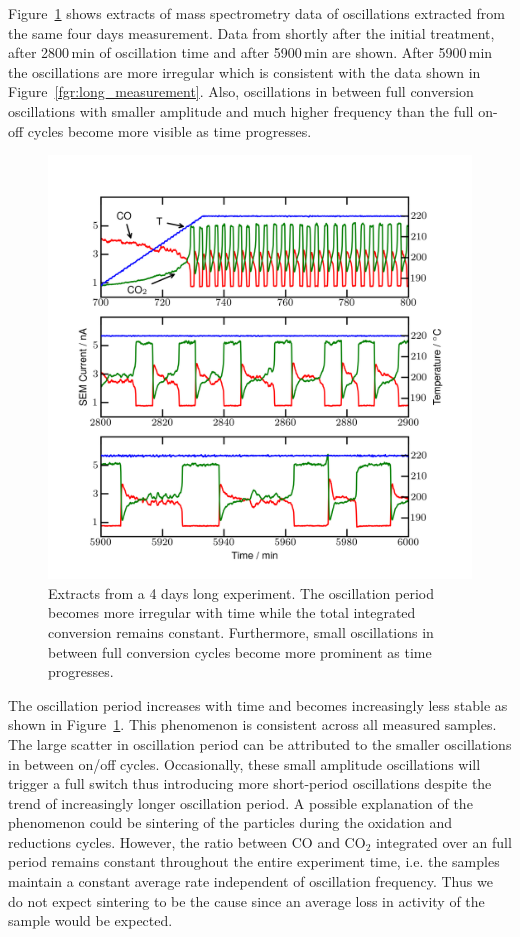 \documentclass[journal=jacsat,manuscript=article]{achemso}
\begin{document}
Figure~\ref{fgr:extracts} shows extracts of mass spectrometry data of oscillations
extracted from the same four days measurement. Data from shortly after the
initial treatment, after 2800\,min of oscillation time and after 5900\,min are
shown. After 5900\,min the oscillations are more irregular which is consistent
with the data shown in Figure~\ref{fgr:long_measurement}. Also, oscillations in
between full conversion oscillations with smaller amplitude and much higher
frequency than the full on-off cycles become more visible as time progresses.
\begin{figure}
  \includegraphics[width=12cm]{extracts_from_very_long_oscillation.png}
  \caption{Extracts from a 4 days long experiment. The oscillation period
  becomes more irregular with time while the total integrated conversion
  remains constant. Furthermore, small oscillations in between full conversion
  cycles become more prominent as time progresses.} \label{fgr:extracts}
\end{figure}

The oscillation period increases with time and becomes increasingly less stable
as shown in Figure~\ref{fgr:extracts}. This phenomenon is consistent across all
measured samples. The large scatter in oscillation period can be attributed to
the smaller oscillations in between on/off cycles. Occasionally, these small
amplitude oscillations will trigger a full switch thus introducing more
short-period oscillations despite the trend of increasingly longer oscillation
period. A possible explanation of the phenomenon could be sintering of the
particles during the oxidation and reductions cycles. However, the ratio
between CO and CO$_2$ integrated over an full period remains constant
throughout the entire experiment time, i.e. the samples maintain a constant
average rate independent of oscillation frequency. Thus we do not expect
sintering to be the cause since an average loss in activity of the sample would
be expected.
\end{document}
